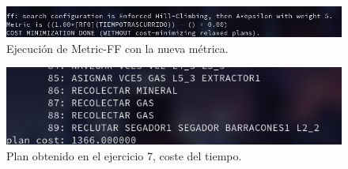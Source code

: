 \documentclass[10pt, spanish]{article}
\begin{document}
\begin{figure}[H]
	\centering
	\includegraphics[scale=0.4]{usoMetrica.png}
	\caption{Ejecución de Metric-FF con la nueva métrica.}
	\label{plan7me}
\end{figure}

\begin{figure}[H]
	\centering
	\includegraphics[scale=0.4]{plan7.png}
	\caption{Plan obtenido en el ejercicio 7, coste del tiempo.}
	\label{plan7}
\end{figure}
\end{document}

